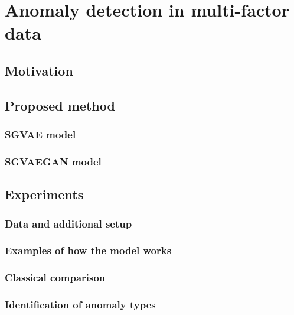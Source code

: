 \chapter{Anomaly detection in multi-factor data}


\section{Motivation}

\section{Proposed method}

\subsection{SGVAE model}

\subsection{SGVAEGAN model}

\section{Experiments}

\subsection{Data and additional setup}

\subsection{Examples of how the model works}

\subsection{Classical comparison}

\subsection{Identification of anomaly types}

